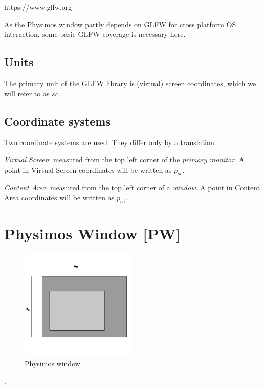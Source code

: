 \documentclass[12pt]{article}
\begin{document}
https://www.glfw.org
\vspace{1em}

As the Physimos window partly depends on GLFW for cross platform OS interaction, some basic GLFW coverage is necessary here.

\subsection{Units}

The primary unit of the GLFW library is (virtual) screen coordinates, which we will refer to as $sc$.


\subsection{Coordinate systems}

Two coordinate systems are used. They differ only by a translation. 


\textit{Virtual Screen}: measured from the top left corner of the \textit{primary monitor}. A point in Virtual Screen coordinates will be written as $p_{sc}$.

\textit{Content Area}: measured from the top left corner of a \textit{window}. A point in Content Area coordinates will be written as $p_{ca}$.




\section{Physimos Window [PW]}

\begin{figure}[H]
    \centering
    \includegraphics[width=0.5\textwidth]{./window-inkscape.png}
    \caption{Physimos window}
    \label{fig:mesh1}
\end{figure}

\LaTeXe.
\end{document}
